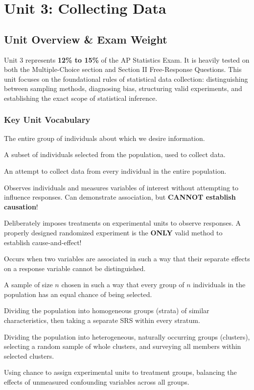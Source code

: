 ﻿%
\chapter{Unit 3: Collecting Data}

\section{Unit Overview \& Exam Weight}
Unit 3 represents \textbf{12\% to 15\%} of the AP Statistics Exam. It is heavily tested on both the Multiple-Choice section and Section II Free-Response Questions. This unit focuses on the foundational rules of statistical data collection: distinguishing between sampling methods, diagnosing bias, structuring valid experiments, and establishing the exact scope of statistical inference.

\subsection*{Key Unit Vocabulary}
\begin{description}[leftmargin=1.5em, style=nextline]
  \item[Population:] The entire group of individuals about which we desire information.
  \item[Sample:] A subset of individuals selected from the population, used to collect data.
  \item[Census:] An attempt to collect data from every individual in the entire population.
  \item[Observational Study:] Observes individuals and measures variables of interest without attempting to influence responses. Can demonstrate association, but \textbf{CANNOT establish causation}!
  \item[Experiment:] Deliberately imposes treatments on experimental units to observe responses. A properly designed randomized experiment is the \textbf{ONLY} valid method to establish cause-and-effect!
  \item[Confounding:] Occurs when two variables are associated in such a way that their separate effects on a response variable cannot be distinguished.
  \item[Simple Random Sample (SRS):] A sample of size $n$ chosen in such a way that every group of $n$ individuals in the population has an equal chance of being selected.
  \item[Stratified Random Sample:] Dividing the population into homogeneous groups (strata) of similar characteristics, then taking a separate SRS within every stratum.
  \item[Cluster Sample:] Dividing the population into heterogeneous, naturally occurring groups (clusters), selecting a random sample of whole clusters, and surveying all members within selected clusters.
  \item[Random Assignment:] Using chance to assign experimental units to treatment groups, balancing the effects of unmeasured confounding variables across all groups.
\end{description}

